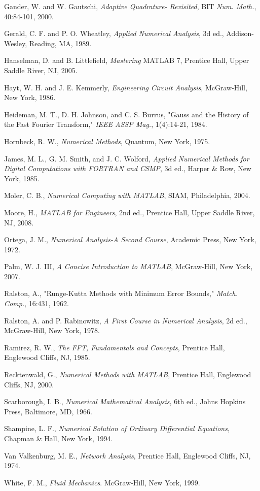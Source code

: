 \documentclass[../main.tex]{subfiles}
\begin{document}
\begin{multicols}{2}
    Gander, W. and W. Gautschi, \textit{Adaptive Quadrature-
    Revisited}, BIT \textit{Num. Math.}, 40:84-101, 2000.

    Gerald, C. F. and P. O. Wheatley, \textit{Applied Numerical 
    Analysis}, 3d ed., Addison-Wesley, Reading, 
    MA, 1989.

    Hanselman, D. and B. Littlefield, \textit{Mastering} MATLAB 7,
    Prentice Hall, Upper Saddle River, NJ, 2005.

    Hayt, W. H. and J. E. Kemmerly, \textit{Engineering Circuit
    Analysis}, McGraw-Hill, New York, 1986.

    Heideman, M. T., D. H. Johnson, and C. S. Burrus, "Gauss
    and the History of the Fast Fourier Transform," \textit{IEEE
    ASSP Mag.}, 1(4):14-21, 1984.

    Hornbeck, R. W., \textit{Numerical Methods}, Quantum, 
    New York, 1975.

    James, M. L., G. M. Smith, and J. C. Wolford, \textit{Applied
    Numerical Methods for Digital Computations with
    FORTRAN and CSMP}, 3d ed., Harper \& Row, 
    New York, 1985.

    Moler, C. B., \textit{Numerical Computing with MATLAB}, SIAM,
    Philadelphia, 2004.

    Moore, H., \textit{MATLAB for Engineers}, 2nd ed., Prentice Hall,
    Upper Saddle River, NJ, 2008.

    Ortega, J. M., \textit{Numerical Analysis-A Second Course},
    Academic Press, New York, 1972.

    Palm, W. J. III, \textit{A Concise Introduction to MATLAB},
    McGraw-Hill, New York, 2007.

    Ralston, A., "Runge-Kutta Methods with Minimum Error
    Bounds," \textit{Match. Comp.}, 16:431, 1962.

    Ralston, A. and P. Rabinowitz, \textit{A First Course in Numerical
    Analysis}, 2d ed., McGraw-Hill, New York, 1978.

    Ramirez, R. W., \textit{The FFT, Fundamentals and Concepts},
    Prentice Hall, Englewood Cliffs, NJ, 1985.

    Recktenwald, G., \textit{Numerical Methods with MATLAB},
    Prentice Hall, Englewood Cliffs, NJ, 2000.

    Scarborough, I. B., \textit{Numerical Mathematical Analysis}, 
    6th ed., Johns Hopkins Press, Baltimore, MD, 1966.

    Shampine, L. F., \textit{Numerical Solution of Ordinary Differential
    Equations}, Chapman \& Hall, New York, 1994.

    Van Valkenburg, M. E., \textit{Network Analysis}, Prentice Hall,
    Englewood Cliffs, NJ, 1974.

    White, F. M., \textit{Fluid Mechanics}. McGraw-Hill, New York,
    1999.
    
\end{multicols}
\end{document}
